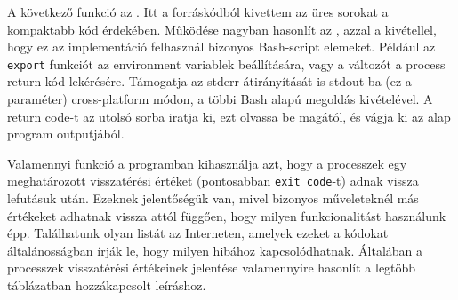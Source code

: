 A következő funkció az \texttt{}. Itt a forráskódból kivettem az üres sorokat a kompaktabb kód érdekében. Működése nagyban hasonlít az \texttt{}, azzal a kivétellel, hogy ez az implementáció felhasznál bizonyos Bash-script elemeket. Például az \texttt{export} funkciót az environment variablek beállítására, vagy a \texttt{} változót a process return kód lekérésére. Támogatja az stderr átirányítását is stdout-ba (ez a \texttt{} paraméter) cross-platform módon, a többi Bash alapú megoldás kivételével. A return code-t az utolsó sorba iratja ki, ezt olvassa be magától, és vágja ki az alap program outputjából.

\pagebreak
{}
Valamennyi funkció a programban kihasználja azt, hogy a processzek egy meghatározott visszatérési értéket (pontosabban \texttt{exit code}-t) adnak vissza lefutásuk után. Ezeknek jelentőségük van, mivel bizonyos műveleteknél más értékeket adhatnak vissza attól függően, hogy milyen funkcionalitást használunk épp. Találhatunk olyan listát az Interneten, amelyek ezeket a kódokat általánosságban írják le, hogy milyen hibához kapcsolódhatnak. 
Általában a processzek visszatérési értékeinek jelentése valamennyire hasonlít a legtöbb táblázatban hozzákapcsolt leíráshoz. \cite{linux_exitcodes}

